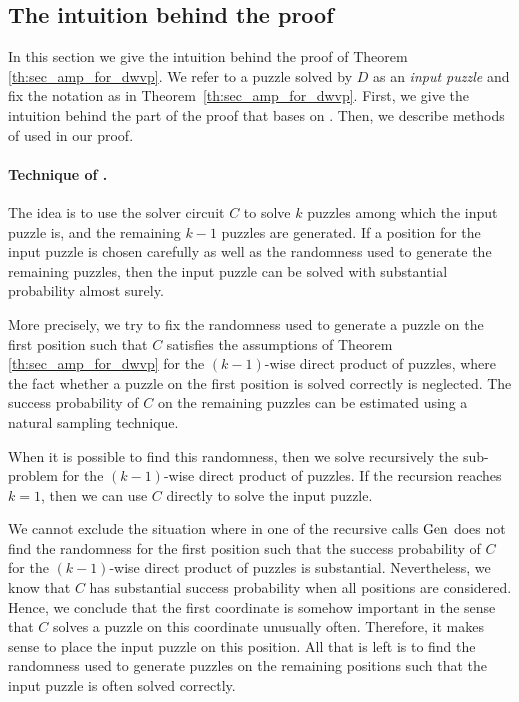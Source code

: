 %
\subsection{The intuition behind the proof}
\label{section:intuition}
In this section we give the intuition behind the proof of Theorem \ref{th:sec_amp_for_dwvp}.
We refer to a puzzle solved by $D$ as an \textit{input puzzle} and fix the notation as in Theorem~\ref{th:sec_amp_for_dwvp}.
First, we give the intuition behind the part of the proof that bases on \cite{canetti2005hardness, holenstein2011general}.
Then, we describe methods of \cite{dodis2009security} used in our proof.

\paragraph{Technique of \cite{canetti2005hardness, holenstein2011general}.}
The idea is to use the solver circuit $C$ to solve $k$ puzzles among which the input puzzle is, and the remaining $k\!-\!1$ puzzles are generated.
If a position for the input puzzle is chosen carefully as well as the randomness used to generate the remaining puzzles,
then the input puzzle can be solved with substantial probability almost surely.

More precisely, we try to fix the randomness used to generate a puzzle on the first position such that $C$
satisfies the assumptions of Theorem \ref{th:sec_amp_for_dwvp}
for the $(k\!-\!1)$-wise direct product of puzzles, where the fact whether a puzzle on the first position is solved correctly is neglected.
The success probability of $C$ on the remaining puzzles can be estimated using a natural sampling technique.

When it is possible to find this randomness, then we solve recursively the sub-problem for the $(k\!-\!1)$-wise direct product of puzzles.
If the recursion reaches $k=1$, then we can use $C$ directly to solve the input puzzle.

We cannot exclude the situation where in one of the recursive calls $\operatorname{\text{Gen}}$ does not
find the randomness for the first position such that the success probability of $C$ for the $(k\!-\!1)$-wise direct product of puzzles is substantial.
Nevertheless, we know that $C$ has substantial success probability when all positions are considered.
Hence, we conclude that the first coordinate is somehow important in the sense that $C$ solves a puzzle on this coordinate unusually often.
Therefore, it makes sense to place the input puzzle on this position.
All that is left is to find the randomness used to generate puzzles on the remaining positions
such that the input puzzle is often solved correctly.

